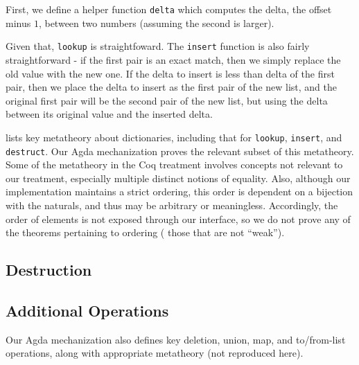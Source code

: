 First, we define a helper function \verb+delta+ which computes the delta, \ie{} the offset minus $1$, between two numbers (assuming the second is larger).

Given that, \verb+lookup+ is straightfoward. The \verb+insert+ function is also fairly straightforward - if the first pair is an exact match, then we simply
%
replace the old value with the new one. If the delta to insert is less than delta of the first pair, then we place the delta to insert as the first pair of the new list, and
%
the original first pair will be the second pair of the new list, but using the delta between its original value and the inserted delta.

\cite[Facts about weak maps]{FMapFacts} lists key metatheory about dictionaries, including that for \verb+lookup+, \verb+insert+, and \verb+destruct+.
%
Our Agda mechanization proves the relevant subset of this metatheory. Some of the metatheory in the Coq treatment involves concepts not relevant to our treatment,
%
especially multiple distinct notions of equality. Also, although our implementation maintains a strict ordering, this order is dependent on a bijection
%
with the naturals, and thus may be arbitrary or meaningless. Accordingly, the order of elements is not exposed through our interface,
%
so we do not prove any of the theorems pertaining to ordering (\ie{} those that are not ``weak'').

\subsection{Destruction}



\subsection{Additional Operations}

Our Agda mechanization also defines key deletion, union, map, and to/from-list operations, along
with appropriate metatheory (not reproduced here).



